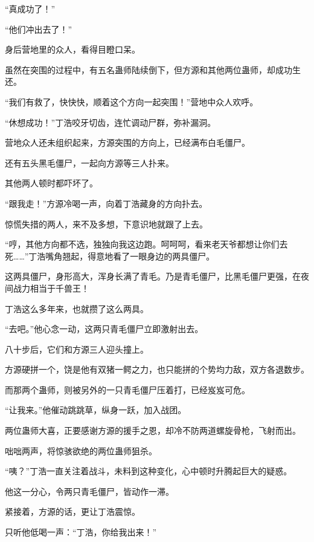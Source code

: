 \begin{this_body}
“真成功了！”

“他们冲出去了！”

身后营地里的众人，看得目瞪口呆。

虽然在突围的过程中，有五名蛊师陆续倒下，但方源和其他两位蛊师，却成功生还。

“我们有救了，快快快，顺着这个方向一起突围！”营地中众人欢呼。

“休想成功！”丁浩咬牙切齿，连忙调动尸群，弥补漏洞。

营地众人还未组织起来，方源突围的方向上，已经满布白毛僵尸。

还有五头黑毛僵尸，一起向方源等三人扑来。

其他两人顿时都吓坏了。

“跟我走！”方源冷喝一声，向着丁浩藏身的方向扑去。

惊慌失措的两人，来不及多想，下意识地就跟了上去。

“哼，其他方向都不选，独独向我这边跑。呵呵呵，看来老天爷都想让你们去死……”丁浩嘴角翘起，得意地看了一眼身边的两具僵尸。

这两具僵尸，身形高大，浑身长满了青毛。乃是青毛僵尸，比黑毛僵尸更强，在夜间战力相当于千兽王！

丁浩这么多年来，也就攒了这么两具。

“去吧。”他心念一动，这两只青毛僵尸立即激射出去。

八十步后，它们和方源三人迎头撞上。

方源硬拼一个，饶是他有双猪一鳄之力，也只能拼的个势均力敌，双方各退数步。

而那两个蛊师，则被另外的一只青毛僵尸压着打，已经岌岌可危。

“让我来。”他催动跳跳草，纵身一跃，加入战团。

两位蛊师大喜，正要感谢方源的援手之恩，却冷不防两道螺旋骨枪，飞射而出。

咄咄两声，将惊骇欲绝的两位蛊师狙杀。

“咦？”丁浩一直关注着战斗，未料到这种变化，心中顿时升腾起巨大的疑惑。

他这一分心，令两只青毛僵尸，皆动作一滞。

紧接着，方源的话，更让丁浩震惊。

只听他低喝一声：“丁浩，你给我出来！”

\end{this_body}

